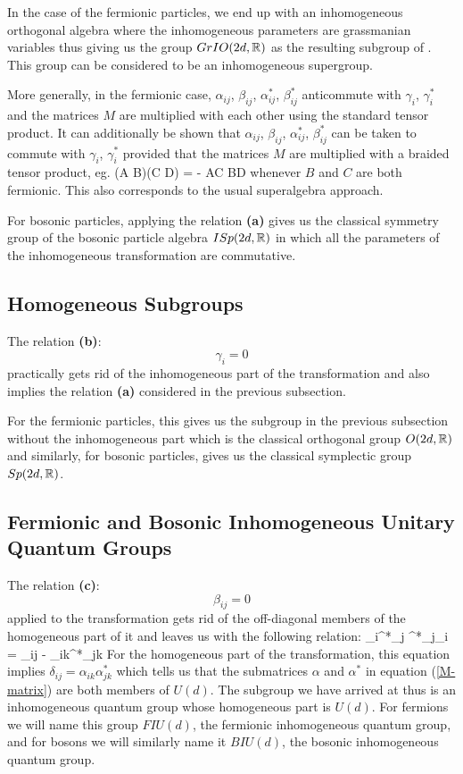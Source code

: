 In the case of the fermionic particles, we end up with an
inhomogeneous orthogonal algebra where the inhomogeneous
parameters are grassmanian variables thus giving us the group
$GrIO(2d, \mathbb{R})$ as the resulting subgroup of \FIO. This group can
be considered to be an inhomogeneous supergroup.

More generally, in the fermionic case, $\alpha_{ij}$,
$\beta_{ij}$, $\alpha^*_{ij}$, $\beta^*_{ij}$ anticommute with
$\gamma_i$, $\gamma^*_i$ and the \FIO matrices $M$ are multiplied
with each other using the standard tensor product. It can
additionally be shown that $\alpha_{ij}$, $\beta_{ij}$,
$\alpha^*_{ij}$, $\beta^*_{ij}$ can be taken to commute with
$\gamma_i$, $\gamma^*_i$ provided that the matrices $M$ are
multiplied with a braided \cite{majid} tensor product, eg. \beq (A
\otimes B)(C \otimes D) = - AC \otimes BD \eeq whenever $B$ and
$C$ are both fermionic. This also corresponds to the usual
superalgebra approach.

For bosonic particles, applying the relation {\bf(a)} gives us the
classical symmetry group of the bosonic particle algebra $ISp(2d,
\mathbb{R})$ in which all the parameters of the inhomogeneous
transformation are commutative.

\subsection{Homogeneous Subgroups}
The relation {\bf(b)}:
\[
\gamma_i = 0
\]
practically gets rid of the inhomogeneous part of the
transformation and also implies the relation {\bf(a)} considered
in the previous subsection.

For the fermionic particles, this gives us the subgroup in the
previous subsection without the inhomogeneous part which is the
classical orthogonal group $O(2d, \mathbb{R})$ and similarly, for bosonic
particles, gives us the classical symplectic group $Sp(2d, \mathbb{R})$.

\subsection{Fermionic and Bosonic Inhomogeneous Unitary Quantum Groups}
The relation {\bf(c)}:
\[
\beta_{ij} = 0
\]
applied to the transformation gets rid of the off-diagonal members
of the homogeneous part of it and leaves us with the following
relation: \beq \gamma_i\gamma^*_j \mp \gamma^*_j\gamma_i =
\delta_{ij} - \alpha_{ik}\alpha^*_{jk} \eeq For the homogeneous
part of the transformation, this equation implies $ \delta_{ij} =
\alpha_{ik}\alpha^*_{jk} $ which tells us that the submatrices
$\alpha$ and $\alpha^*$ in equation (\ref{M-matrix}) are both
members of $U(d)$. The subgroup we have arrived at thus is an
inhomogeneous quantum group whose homogeneous part is $U(d)$. For
fermions we will name this group $FIU(d)$, the fermionic
inhomogeneous quantum group, and for bosons we will similarly name
it $BIU(d)$, the bosonic inhomogeneous quantum group.


